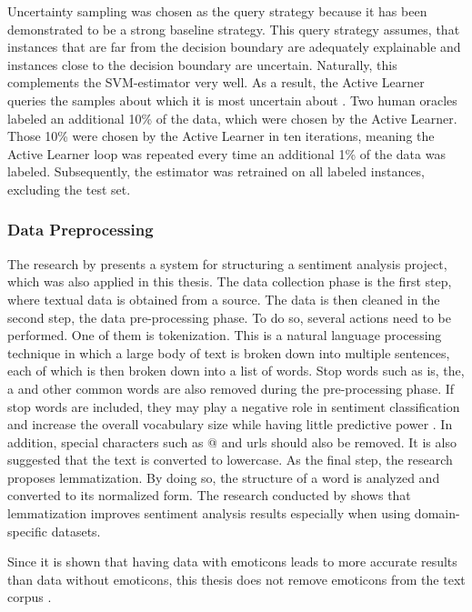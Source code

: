 \documentclass[11pt, a4paper]{article}
\begin{document}
Uncertainty sampling was chosen as the query strategy because it has been demonstrated to be a strong baseline strategy. 
This query strategy assumes, that instances that are far from the decision boundary are adequately explainable and instances close to the 
decision boundary are uncertain. Naturally, this complements the SVM-estimator very well. As a result, the Active Learner queries 
the samples about which it is most uncertain about \citep{osbonre2004ensemblebased}. Two human oracles labeled an additional 10\% of the data,
which were chosen by the Active Learner. Those 10\% were chosen by the Active Learner in ten iterations, meaning the Active Learner loop was repeated
every time an additional 1\% of the data was labeled. Subsequently, the estimator was retrained on all labeled instances, excluding the test set.

\subsubsection{Data Preprocessing}
The research by \cite{jemai2021SentimentAnalysis} presents a system for structuring a sentiment analysis project, which was also applied in this thesis.
The data collection phase is the first step, where textual data is obtained from a source. 
The data is then cleaned in the second step, the data pre-processing phase. To do so, several actions need to be performed.
One of them is tokenization. This is a natural language processing technique in which a large body of text is broken down into multiple sentences, 
each of which is then broken down into a list of words. Stop words such as is, the, a and other common words are also removed during the 
pre-processing phase. If stop words are included, they may play a negative role in sentiment classification and increase the overall 
vocabulary size while having little predictive power \citep{zhao2017comparisontextprocess}.
In addition, special characters such as @ and urls should also be removed. 
It is also suggested that the text is converted to lowercase. As the final step, the research proposes lemmatization. By doing so,
the structure of a word is analyzed and converted to its normalized form. The research conducted by \cite{camachocollados2018role} 
shows that lemmatization improves sentiment analysis results especially when using domain-specific datasets.

Since it is shown that having data with emoticons leads to more accurate results than data without emoticons,
this thesis does not remove emoticons from the text corpus \citep{parveen2016sentimentanalysistwitter}.
\end{document}
